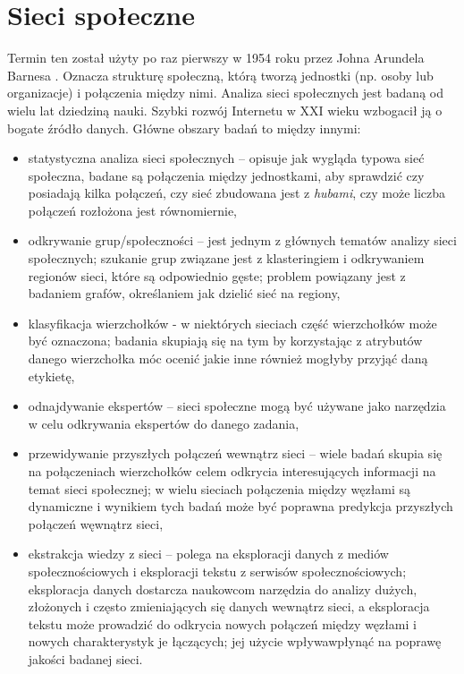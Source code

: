 \section{Sieci społeczne}
Termin ten został użyty po raz pierwszy w 1954 roku przez Johna Arundela Barnesa
\cite{JABarnes}. Oznacza strukturę społeczną, którą tworzą jednostki (np. osoby
lub organizacje) i połączenia między nimi.
Analiza sieci społecznych jest badaną od wielu lat dziedziną nauki. Szybki
rozwój Internetu w XXI wieku wzbogacił ją o bogate źródło danych. Główne obszary
badań \cite{SNDAtopics} to między innymi:
\begin{itemize}
  \item statystyczna analiza sieci społecznych -- opisuje jak wygląda typowa sieć społeczna,
  badane są połączenia między jednostkami, aby sprawdzić czy posiadają kilka połączeń,
  czy sieć zbudowana jest z \emph{hubami}, czy może liczba połączeń rozłożona 
  jest równomiernie,
  \item odkrywanie grup/społeczności -- jest jednym z głównych tematów analizy 
  sieci społecznych; szukanie grup związane jest z klasteringiem i odkrywaniem 
  regionów sieci, które są odpowiednio gęste; problem powiązany jest z badaniem
  grafów, określaniem jak dzielić sieć na regiony,
  \item klasyfikacja wierzchołków - w niektórych sieciach część wierzchołków 
  może być oznaczona; badania skupiają się na tym by korzystając z atrybutów 
  danego wierzchołka móc ocenić jakie inne również mogłyby przyjąć daną etykietę,
  \item odnajdywanie ekspertów -- sieci społeczne mogą być używane jako narzędzia
  w celu odkrywania ekspertów do danego zadania,
  \item przewidywanie przyszłych połączeń wewnątrz sieci -- wiele badań skupia się
  na połączeniach wierzchołków celem odkrycia interesujących informacji na temat
  sieci społecznej; w wielu sieciach połączenia między węzłami są dynamiczne
  i wynikiem tych badań może być poprawna predykcja przyszłych połączeń
  węwnątrz sieci,
  \item ekstrakcja wiedzy z sieci -- polega na eksploracji danych z mediów 
  społecznościowych i eksploracji tekstu z serwisów społecznościowych; 
  eksploracja danych dostarcza naukowcom narzędzia do analizy dużych, 
  złożonych i często zmieniających się danych wewnątrz sieci, a eksploracja tekstu
  może prowadzić do odkrycia nowych połączeń między węzłami i nowych
  charakterystyk je łączących; jej użycie wpływawpłynąć na poprawę jakości
  badanej sieci. 
\end{itemize}



